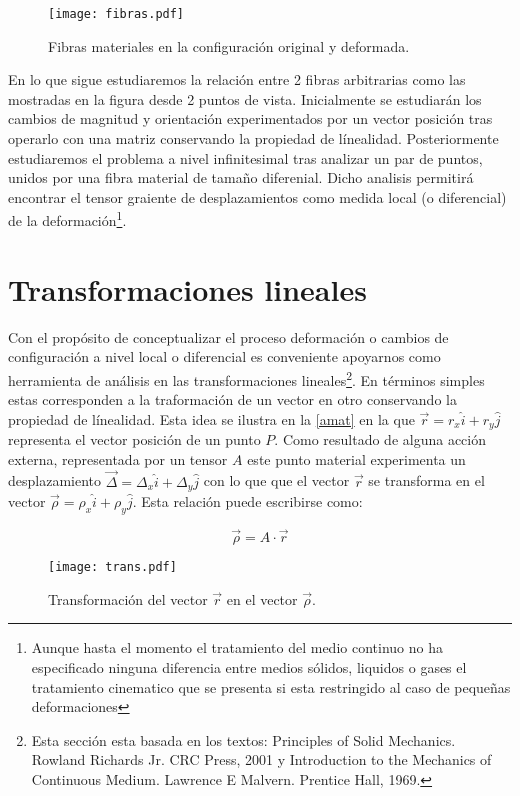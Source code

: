 \documentclass[../notas medios.tex]{subfiles}
\begin{document}
\begin{figure}[H]
\centering
	\texttt{[image: fibras.pdf]}
	\caption{Fibras materiales en la configuración original y deformada.}
	\label{fibras}
\end{figure}

En lo que sigue estudiaremos la relación entre 2 fibras arbitrarias como las mostradas en la figura desde 2 puntos de vista. Inicialmente se estudiarán los cambios de magnitud y orientación experimentados por un vector posición tras operarlo con una matriz conservando la propiedad de línealidad. Posteriormente estudiaremos el problema a nivel infinitesimal tras analizar un par de puntos, unidos por una fibra material de tamaño diferenial. Dicho analisis permitirá encontrar el tensor graiente de desplazamientos como medida local (o diferencial) de la deformación\footnote{Aunque hasta el momento el tratamiento del medio continuo no ha especificado ninguna diferencia entre medios sólidos, liquidos o gases el tratamiento cinematico que se presenta si esta restringido al caso de pequeñas deformaciones}.


\section{Transformaciones lineales}
Con el propósito de conceptualizar el proceso deformación o cambios de configuración a nivel local o diferencial es conveniente apoyarnos como herramienta de análisis en las transformaciones lineales\footnote{Esta sección esta basada en los textos: Principles of Solid Mechanics. Rowland Richards Jr. CRC Press, 2001 y Introduction to the Mechanics of Continuous Medium. Lawrence E Malvern. Prentice Hall, 1969.}. En términos simples estas corresponden a la traformación de un vector en otro conservando la propiedad de línealidad. Esta idea se ilustra en la \cref{amat} en la que $\vec r = {r_x}\hat i + {r_y}\hat j$ representa el vector posición de un punto $P$. Como resultado de alguna acción externa, representada por un tensor $A$ este punto material experimenta un desplazamiento $\vec \Delta  = {\Delta _x}\hat i + {\Delta _y}\hat j$ con lo que que el vector $\vec{r}$ se transforma en el vector $\vec \rho  = {\rho _x}\hat i + {\rho _y}\hat j$. Esta relación puede escribirse como:

\begin{equation}
\vec \rho  = A \cdot \vec r
\label{amat}
\end{equation}

%
\begin{figure}[H]
\centering
	\texttt{[image: trans.pdf]}
	\caption{Transformación del vector $\vec{r}$ en el vector $\vec{\rho}$.}
	\label{trans}
\end{figure}
\end{document}
